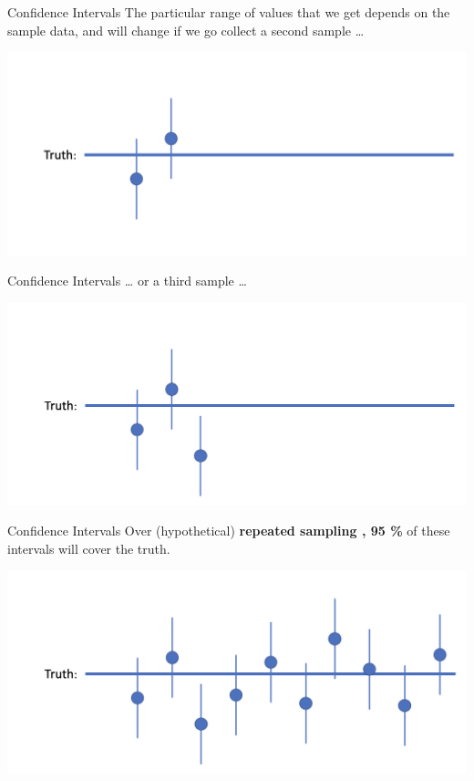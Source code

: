 \documentclass[
  ignorenonframetext,
]{beamer}
\begin{document}
\begin{frame}{Confidence Intervals}
\protect\hypertarget{confidence-intervals-3}{}
The particular range of values that we get depends on the sample data,
and will change if we go collect a second sample \ldots{}

\includegraphics{ci4.png}
\end{frame}

\begin{frame}{Confidence Intervals}
\protect\hypertarget{confidence-intervals-4}{}
\ldots{} or a third sample \ldots{}

\includegraphics{ci5.png}
\end{frame}

\begin{frame}{Confidence Intervals}
\protect\hypertarget{confidence-intervals-5}{}
Over (hypothetical) \textbf{repeated sampling , 95 \% }of these
intervals will cover the truth.

\includegraphics{ci6.png}
\end{frame}
\end{document}
